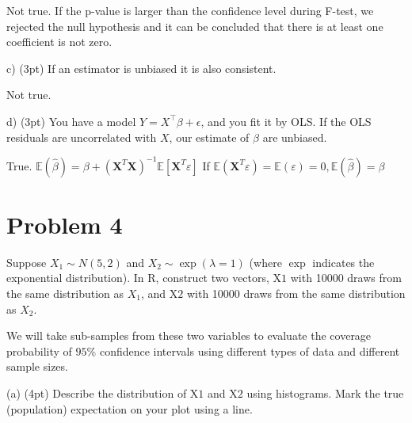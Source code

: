 \documentclass{article}\usepackage[]{graphicx}\usepackage[]{color}
\begin{document}
\vspace*{0.5cm}
Not true. If the p-value is larger than the confidence level during F-test, we rejected the null hypothesis and it can be concluded that there is at least one coefficient is not zero. 
\vspace*{0.5cm}


c) (3pt) If an estimator is unbiased it is also consistent.

\vspace*{0.5cm}
Not true. 
\vspace*{0.5cm}

d) (3pt) You have a model $Y=X^{\top} \beta+\epsilon$, and you fit it by OLS. If the OLS residuals are uncorrelated with $X$, our estimate of $\beta$ are unbiased. 

\vspace*{0.5cm}
True. 
$
\mathbb{E}(\hat{\beta}) 
=\beta+\left(\mathbf{X}^{T} \mathbf{X}\right)^{-1} \mathbb{E}\left[\mathbf{X}^{T} \varepsilon\right]
$
If $\mathbb{E}\left(\mathbf{X}^{T} \varepsilon\right)= \mathbb{E}(\varepsilon) = 0, \mathbb{E}(\hat{\beta})  = \beta$
\vspace*{0.5cm}



\section*{Problem 4}

Suppose $X_{1} \sim N(5,2)$ and $X_{2} \sim \exp (\lambda=1)$ (where $\exp$ indicates the exponential distribution). In $\mathrm{R}$, construct two vectors, $\mathrm{X1}$ with 10000 draws from the same distribution as $X_{1}$, and $\mathrm{X2}$ with 10000 draws from the same distribution as $X_{2}$.

We will take sub-samples from these two variables to evaluate the coverage probability of $95 \%$ confidence intervals using different types of data and different sample sizes.

(a) (4pt) Describe the distribution of $\mathrm{X1}$ and $\mathrm{X2}$ using histograms. Mark the true (population) expectation on your plot using a line.
\end{document}
